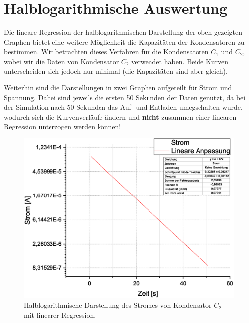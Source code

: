 \documentclass[10pt,a4paper]{article}
\begin{document}
\section{Halblogarithmische Auswertung}
\begin{flushleft}
Die lineare Regression der halblogarithmischen Darstellung der oben gezeigten Graphen bietet eine weitere Möglichkeit die Kapazitäten der Kondensatoren zu bestimmen. Wir betrachten dieses Verfahren für die Kondensatoren $C_1$ und $C_2$, wobei wir die Daten von Kondensator $C_2$ verwendet haben. Beide Kurven unterscheiden sich jedoch nur minimal (die Kapazitäten sind aber gleich).

Weiterhin sind die Darstellungen in zwei Graphen aufgeteilt für Strom und Spannung. Dabei sind jeweils die ersten 50 Sekunden der Daten genutzt, da bei der Simulation nach 50 Sekunden das Auf- und Entladen umegschalten wurde, wodurch sich die Kurvenverläufe ändern und \textbf{nicht} zusammen einer linearen Regression unterzogen werden können! 

\begin{figure}[H]
\centering
\includegraphics[scale=0.5]{Graph_Strom}
\caption{Halblogarithmische Darstellung des Stromes von Kondensator $C_2$ mit linearer Regression.}
\end{figure}


\end{flushleft}
\end{document}
